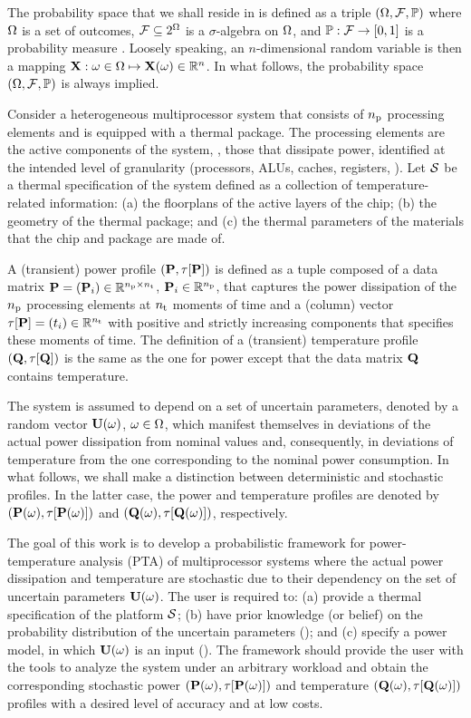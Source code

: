 
The probability space that we shall reside in is defined as a triple $(\Omega, \mathcal{F}, \mathbb{P})$ where $\Omega$ is a set of outcomes, $\mathcal{F} \subseteq 2^\Omega$ is a $\sigma$-algebra on $\Omega$, and $\mathbb{P}: \mathcal{F} \to [0, 1]$ is a probability measure \cite{maitre2010}.
Loosely speaking, an $n$-dimensional random variable is then a mapping $\mathbf{X}: \omega \in \Omega \mapsto \mathbf{X}(\omega) \in \mathbb{R}^n$.
In what follows, the probability space $(\Omega, \mathcal{F}, \mathbb{P})$ is always implied.

Consider a heterogeneous multiprocessor system that consists of ${n_\text{p}}$ processing elements and is equipped with a thermal package.
The processing elements are the active components of the system, \ie, those that dissipate power, identified at the intended level of granularity (processors, ALUs, caches, registers, \etc).
Let $\mathcal{S}$ be a thermal specification of the system defined as a collection of temperature-related information: (a) the floorplans of the active layers of the chip; (b) the geometry of the thermal package; and (c) the thermal parameters of the materials that the chip and package are made of.

A (transient) power profile $\profileP$ is defined as a tuple composed of a data matrix $\mP = (\vP_i) \in \real^{\nprocs \times \nsteps}$, $\mathbf{P}_i \in \mathbb{R}^{n_\text{p}}$, that captures the power dissipation of the ${n_\text{p}}$ processing elements at ${n_\text{t}}$ moments of time and a (column) vector $\partition{\mP} = (\t_i) \in \real^{\nsteps}$ with positive and strictly increasing components that specifies these moments of time.
The definition of a (transient) temperature profile $\profileT$ is the same as the one for power except that the data matrix $\mTO$ contains temperature.

The system is assumed to depend on a set of uncertain parameters, denoted by a random vector $\mathbf{U}(\omega)$, $\omega \in \Omega$, which manifest themselves in deviations of the actual power dissipation from nominal values and, consequently, in deviations of temperature from the one corresponding to the nominal power consumption.
In what follows, we shall make a distinction between deterministic and stochastic profiles.
In the latter case, the power and temperature profiles are denoted by $\profileP{\o}$ and $\profileT{\o}$, respectively.

The goal of this work is to develop a probabilistic framework for power-temperature analysis (PTA) of multiprocessor systems where the actual power dissipation and temperature are stochastic due to their dependency on the set of uncertain parameters $\mathbf{U}(\omega)$.
The user is required to: (a) provide a thermal specification of the platform $\mathcal{S}$; (b) have prior knowledge (or belief) on the probability distribution of the uncertain parameters (); and (c) specify a power model, in which $\mathbf{U}(\omega)$ is an input ().
The framework should provide the user with the tools to analyze the system under an arbitrary workload and obtain the corresponding stochastic power $\profileP{\o}$ and temperature $\profileT{\o}$ profiles with a desired level of accuracy and at low costs.
